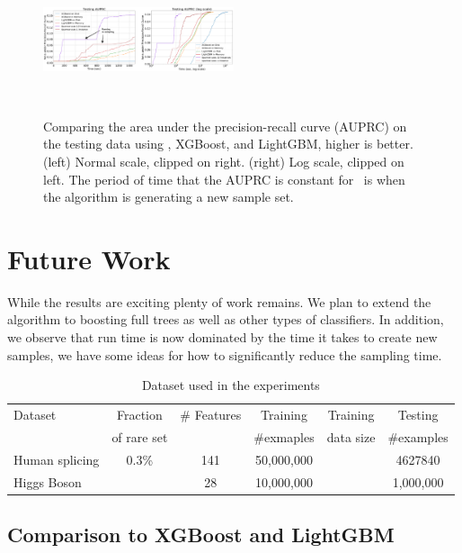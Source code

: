 \begin{figure}[t]
    \centering
    \includegraphics[width=0.5\textwidth]{figs/splice-auprc.png}
    \caption{Comparing the area under the precision-recall curve (AUPRC) on the testing data
    using \Sparrow, XGBoost, and LightGBM, higher is better.
    (left) Normal scale, clipped on right.
    (right) Log scale, clipped on left.
    The period of time that the AUPRC is constant for \Sparrow\ is when the algorithm is generating a new sample set.}~\label{fig:auprc}
\end{figure}


\section{Future Work}\label{sec:Conclusion}
While the results are exciting plenty of work remains. We plan to
extend the algorithm to boosting full trees as well as other types of
classifiers.
In addition, we observe that run time is now dominated by the time it
takes to create new samples, we have some ideas for how to
significantly reduce the sampling time.





\iffalse

\begin{table}[h]
\centering
\caption{Dataset used in the experiments}\label{tab:dataset}
\begin{tabular}{|l|ccccc|}
\cline{1-6}
Dataset         & Fraction    & \# Features & Training    &  Training  & Testing     \\
                & of rare set &             & \#exmaples  &  data size & \#examples  \\ \cline{1-6}
Human splicing  & 0.3\%       & 141         & 50,000,000  &            & 4627840     \\ \cline{1-6}
Higgs Boson     &             & 28          & 10,000,000  &            & 1,000,000   \\ \cline{1-6}
\end{tabular}
\end{table}

\subsection{Comparison to XGBoost and LightGBM}


